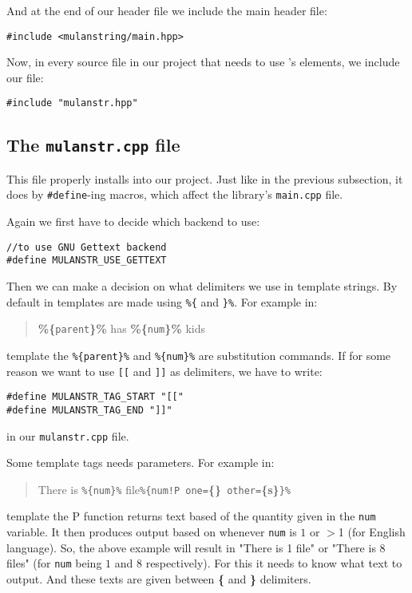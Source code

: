 And at the end of our header file we include the \mulan{} main header file:
\begin{verbatim}
#include <mulanstring/main.hpp>
\end{verbatim}

Now, in every source file in our project that needs to use \mulan{}'s elements, we include our file:
\begin{verbatim}
#include "mulanstr.hpp"
\end{verbatim}

\subsection{The \texttt{mulanstr.cpp} file}
This file properly installs \mulan{} into our project. 
Just like in the previous subsection, it does by \verb+#define+-ing macros, which affect the library's \verb+main.cpp+ file.

Again we first have to decide which backend to use:
\begin{verbatim}
//to use GNU Gettext backend
#define MULANSTR_USE_GETTEXT
\end{verbatim}

Then we can make a decision on what delimiters we use in template strings. 
By default in \mulan{} templates are made using \verb+%{+ and \verb+}%+. For example in:
\begin{quotation}
	\textbf{\%\{}\texttt{parent}\textbf{\}\%} has \textbf{\%\{}\texttt{num}\textbf{\}\%} kids
\end{quotation}
template the \verb+%{parent}%+ and \verb+%{num}%+ are substitution commands. 
If for some reason we want to use \verb+[[+ and \verb+]]+ as delimiters, we have to write:
\begin{verbatim}
#define MULANSTR_TAG_START "[["
#define MULANSTR_TAG_END "]]"
\end{verbatim} in our \texttt{mulanstr.cpp} file.

Some template tags needs parameters. For example in:
\begin{quotation}
	There is \verb+%{num}%+ file\verb+%{num!P one=+\textbf{\{\}}\verb+ other=+\textbf{\{s\}}\verb+}%+
\end{quotation}
template the \textsc{P} function returns text based of the quantity given in the \texttt{num} variable. 
It then produces output based on whenever \texttt{num} is $1$ or $>$1 (for English language).
So, the above example will result in "There is 1 file" or "There is 8 files" (for \texttt{num} being $1$ and $8$ respectively).
For this it needs to know what text to output. And these texts are given between \textbf{\{} and \textbf{\}} delimiters.

